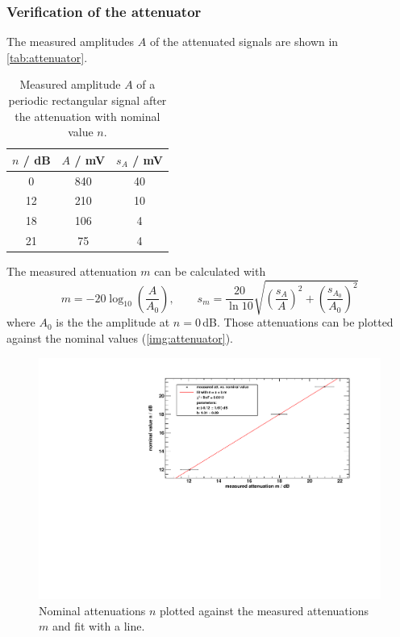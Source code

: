 \subsubsection{Verification of the attenuator}
The measured amplitudes $A$ of the attenuated signals are shown in \autoref{tab:attenuator}.
\begin{table}[H]
\caption{Measured amplitude $A$ of a periodic rectangular signal after the attenuation with nominal value $n$.}
\begin{center}
\begin{tabular}{|c|c|c|}
    \hline
    $n$ / dB 	& $A$ / mV 	& $s_A$ / mV	\\ \hline \hline
    0 			& 840		& 40			\\ \hline
    12			& 210		& 10			\\ \hline
    18			& 106		& 4				\\ \hline
    21			& 75		& 4				\\ \hline
\end{tabular}
\end{center}
\label{tab:attenuator}
\end{table}
The measured attenuation $m$ can be calculated with
\begin{equation}
    m = - 20 \log_{10} \left( \frac{A}{A_0} \right), \qquad s_m = \frac{20}{\ln 10} \sqrt{ \left( \frac{s_A}{A} \right)^2 + \left( \frac{s_{A_0}}{A_0} \right)^2}
\end{equation}
where $A_0$ is the the amplitude at $n=0$\,dB.
Those attenuations can be plotted against the nominal values (\autoref{img:attenuator}).
\begin{figure}[H]
\begin{center}
  \includegraphics[width=\textwidth]{../img/attenuator.pdf}
  \caption{Nominal attenuations $n$ plotted against the measured attenuations $m$ and fit with a line.}
  \label{img:attenuator}
\end{center}
\end{figure}
